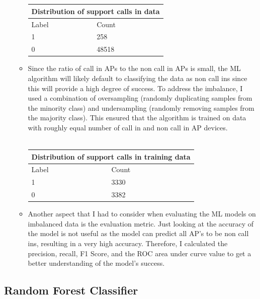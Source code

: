 \documentclass{article}
\begin{document}
\begin{enumerate}
\begin{itemize}
            \\ \\
            \begin{tabular}{ |p{2cm}|p{2cm}| }
                \hline
                \multicolumn{2}{|c|}{Distribution of support calls in data} \\
                \hline
                Label & Count \\
                \hline
                1 & 258 \\
                0 & 48518 \\
                \hline
            \end{tabular}
            
            \item Since the ratio of call in APs to the non call in APs is small, the ML algorithm will likely default to classifying the data as non call ins since this will provide a high degree of success. To address the imbalance, I used a combination of oversampling (randomly duplicating samples from the minority class) and undersampling (randomly removing samples from the majority class). This ensured that the algorithm is trained on data with roughly equal number of call in and non call in AP devices.
            \\ \\
            \begin{tabular}{ |p{2cm}|p{2cm}| }
                \hline
                \multicolumn{2}{|c|}{Distribution of support calls in training data} \\
                \hline
                Label & Count \\
                \hline
                1 & 3330 \\
                0 & 3382 \\
                \hline
            \end{tabular}
            \item Another aspect that I had to consider when evaluating the ML models on imbalanced data is the evaluation metric. Just looking at the accuracy of the model is not useful as the model can predict all AP's to be non call ins, resulting in a very high accuracy. Therefore, I calculated the precision, recall, F1 Score, and the ROC area under curve value to get a better understanding of the model's success.
        \end{itemize}
\end{enumerate}

\subsection{Random Forest Classifier}
\end{document}
